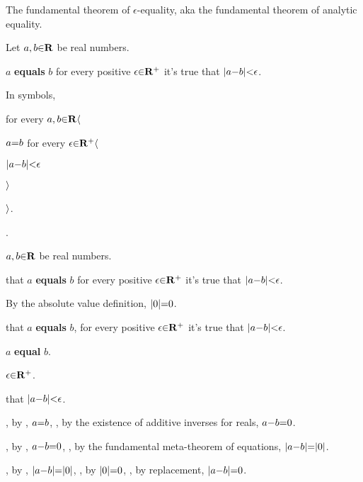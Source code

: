 \vs
\theorem The fundamental theorem of $\epsilon$-equality, aka the fundamental theorem of analytic equality. \par
Let $a,b \p\in \R$ be real numbers. \par
   $a$ {\bf equals} $b$  for every positive $\epsilon\p\in \R^+$ it's true that $\a|a \p- b\a| \p< \epsilon$. \par
In symbols, \par

  \hs for every $a,b \p\in \R \a\langle$ \par
    \hs\hs $a\p=b$  for every $\epsilon \p\in \R^+ \a\langle$ \par
      \hs\hs\hs $\a|a \p- b\a| \p< \epsilon$ \par
    \hs\hs $\a\rangle$ \par
  \hs $\a\rangle$. \par

. \par
{}  $a,b \p\in \R$ be real numbers. \par
{} that $a$ {\bf equals} $b$  for every positive $\epsilon\p\in \R^+$ it's true that $\a|a \p- b\a| \p< \epsilon$. \par
{} By the absolute value definition, $\a|0\a| \p= 0$. \par

  \vs
  \hs {} that  $a$ {\bf equals} $b$,  for every positive $\epsilon\p\in \R^+$ it's true that $\a|a \p- b\a| \p< \epsilon$. \par
    \hs\hs{}  $a$ {\bf equal} $b$. \par
    \hs\hs{}  $\epsilon \p\in \R^+$. \par
    \hs\hs {} that $\a|a \p- b\a| \p< \epsilon$. \par
      \hs\hs\hs{}, by , $a \p= b$,        , by the existence of additive inverses for reals,  $a \p- b \p= 0$. \par
      \hs\hs\hs{}, by , $a \p- b \p = 0$, , by the fundamental meta-theorem of equations,  $\a|a \p- b\a| \p= \a|0\a|$. \par
      \hs\hs\hs{}, by , $\a|a \p- b\a| \p= \a|0\a|$, , by  $\p|0\p|\p = 0$, , by replacement,  $\a|a \p- b\a| \p= 0$. \par

